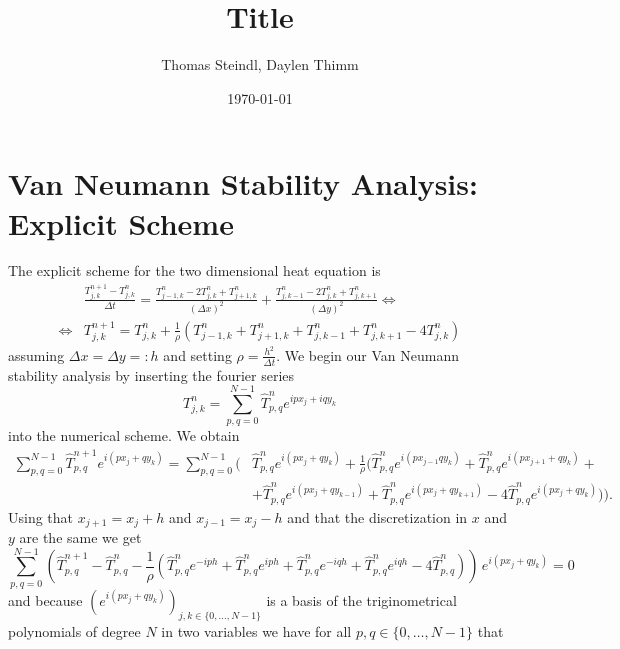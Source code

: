 \documentclass[a4aper,pagesize]{scrartcl}
\title{Title}
\date{\today}
\author{Thomas Steindl, Daylen Thimm}
\theoremstyle{definition}
\theoremstyle{plain}
\theoremstyle{remark}
\renewcommand{\hat}{\widehat}
\begin{document}
\maketitle

\section{Van Neumann Stability Analysis: Explicit Scheme}
The explicit scheme for the two dimensional heat equation is
\begin{align}
	&\frac{T_{j,k}^{n+1} - T_{j,k}^{n}}{\Delta t}
	= \frac{T_{j-1,k}^{n} - 2 T_{j,k}^{n} + T_{j+1,k}^{n}}{(\Delta x)^2}
	+ \frac{T_{j,k-1}^{n} - 2 T_{j,k}^{n} + T_{j,k+1}^{n}}{(\Delta y)^2}
\Leftrightarrow\\
\Leftrightarrow
	&T_{j,k}^{n+1}
	= T_{j,k}^{n}
	+ \frac{1}{\rho} \left(
		T_{j-1,k}^{n}
		+ T_{j+1,k}^{n}
		+ T_{j,k-1}^{n}
		+ T_{j,k+1}^{n}
		- 4 T_{j,k}^{n}
	\right)
\end{align}
assuming $\Delta x = \Delta y =: h$ and setting $\rho = \frac{h^2}{\Delta t}$. We begin our Van Neumann stability analysis by inserting the fourier series
\begin{equation}
	T_{j,k}^n = \sum_{p,q = 0}^{N-1} \hat{T}^n_{p,q} e^{ipx_j + iqy_k}
\end{equation}
into the numerical scheme. We obtain
\begin{equation}
	\begin{split}
		\sum_{p,q = 0}^{N-1} \hat{T}^{n+1}_{p,q} e^{i(px_{j} + qy_{k})} =
		\sum_{p,q = 0}^{N-1} (
			&\hat{T}^{n}_{p,q} e^{i(px_{j} + qy_{k})} +
			\frac{1}{\rho} (
			  	  \hat{T}^{n}_{p,q} e^{i(px_{j-1} qy_{k})}
				+ \hat{T}^{n}_{p,q} e^{i(px_{j+1} + qy_{k})} + \\
			   &+ \hat{T}^{n}_{p,q} e^{i(px_{j} + qy_{k-1})}
				+ \hat{T}^{n}_{p,q} e^{i(px_{j} + qy_{k+1})}
				-  4 \hat{T}^{n}_{p,q} e^{i(px_{j} + qy_{k})}
			)
		).
	\end{split}
\end{equation}
Using that $x_{j+1} = {x_j} + h$ and $x_{j-1} = {x_j} - h$ and that the discretization in $x$ and $y$ are the same we get
\begin{equation}
	\sum_{p,q = 0}^{N-1}(
		  \hat{T}^{n+1}_{p,q}
		- \hat{T}^{n}_{p,q}
		-\frac{1}{\rho} (
			  \hat{T}^{n}_{p,q} e^{-iph}
			+ \hat{T}^{n}_{p,q} e^{iph}
		    + \hat{T}^{n}_{p,q} e^{-iqh}
			+ \hat{T}^{n}_{p,q} e^{iqh}
			-  4 \hat{T}^{n}_{p,q}
		)
	)\, e^{i(px_{j} + qy_{k})} = 0
\end{equation}
and because $(e^{i(px_{j} + qy_{k})})_{j,k \in \{0, ..., N-1\}}$ is a basis of the triginometrical polynomials of degree $N$ in two variables we have for all $p,q \in \{0, \dots, N-1\}$ that
\end{document}
